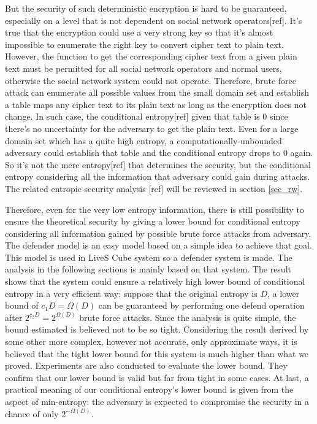 \documentclass[10pt,a4paper]{article}
\begin{document}
	But the security
	of such deterministic encryption is hard to be guaranteed, especially
	on a level that is not dependent on social network operators[ref].
	It's true that the encryption could use a very strong key
	so that it's almost impossible to enumerate the right key to convert cipher text
	to plain text. However, the function to get the corresponding
	cipher text from a given plain text must be permitted for all
	social network operators and normal users, otherwise the social network
	system could not operate.
	Therefore, brute force attack can enumerate all possible values from the
	small domain set and establish a table maps any cipher text
	to its plain text as long as the encryption
	does not change. In such case, the conditional entropy[ref] given that table
	is $0$ since there's no uncertainty for the adversary to get the plain text.
	Even for a large domain set which has a quite high entropy, a
	computationally-unbounded adversary could establish that table
	and the conditional entropy drops to $0$ again. 
	So it's not the mere entropy[ref] that
	determines the security, but the conditional entropy considering
	all the information that adversary could gain during attacks.
	The related entropic security analysis [ref] will be reviewed
	in section \ref{sec_rw}.
	
	Therefore, even for the very low entropy information, 
	there is still possibility to ensure the
	theoretical security by giving a lower bound for conditional entropy
	considering all information gained by possible brute force attacks from adversary.
	The defender model is an easy model based on a simple idea to achieve that goal.
	This model is used in LiveS Cube system so a defender system is made.
	The analysis in the following sections is mainly based on that system.
	The result shows that the system could ensure a relatively high lower bound
	of conditional entropy in a very efficient way: suppose that the original entropy
	is $D$, a lower bound of $c_1 D = \Omega(D)$ can be guaranteed
	by performing one defend operation after $2^{c_2 D} = 2^{\Omega(D)}$ 
	brute force attacks. Since the analysis is quite simple, the
	bound estimated is believed not to be so tight. 
	Considering the result derived by some other
	more complex, however not accurate, only approximate ways, it is believed
	that the tight lower bound for this system is much higher than what we proved.
	Experiments are also conducted to evaluate the lower bound. They confirm that
	our lower bound is valid but far from tight in some cases. At last, a practical
	meaning of our conditional entropy's lower bound is given from the aspect
	of min-entropy: the adversary is expected to compromise the security in a
	chance of only $2^{-\Omega(D)}$.
	
\end{document}
